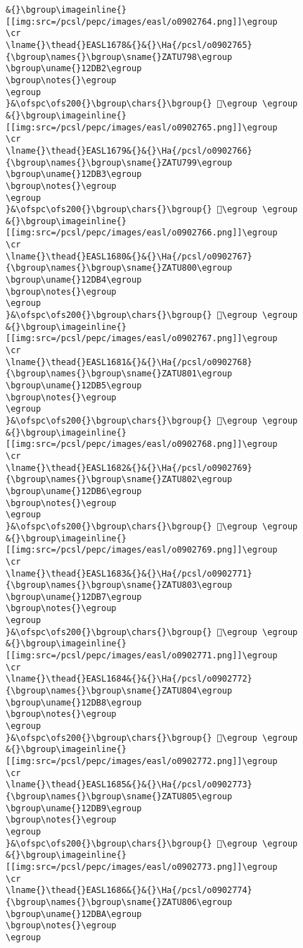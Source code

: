 \begin{verbatim}
&{}\bgroup\imageinline{}[[img:src=/pcsl/pepc/images/easl/o0902764.png]]\egroup
\cr
\lname{}\thead{}EASL1678&{}&{}\Ha{/pcsl/o0902765}{\bgroup\names{}\bgroup\sname{}ZATU798\egroup
\bgroup\uname{}12DB2\egroup
\bgroup\notes{}\egroup
\egroup
}&\ofspc\ofs200{}\bgroup\chars{}\bgroup{} 𒶲\egroup \egroup
&{}\bgroup\imageinline{}[[img:src=/pcsl/pepc/images/easl/o0902765.png]]\egroup
\cr
\lname{}\thead{}EASL1679&{}&{}\Ha{/pcsl/o0902766}{\bgroup\names{}\bgroup\sname{}ZATU799\egroup
\bgroup\uname{}12DB3\egroup
\bgroup\notes{}\egroup
\egroup
}&\ofspc\ofs200{}\bgroup\chars{}\bgroup{} 𒶳\egroup \egroup
&{}\bgroup\imageinline{}[[img:src=/pcsl/pepc/images/easl/o0902766.png]]\egroup
\cr
\lname{}\thead{}EASL1680&{}&{}\Ha{/pcsl/o0902767}{\bgroup\names{}\bgroup\sname{}ZATU800\egroup
\bgroup\uname{}12DB4\egroup
\bgroup\notes{}\egroup
\egroup
}&\ofspc\ofs200{}\bgroup\chars{}\bgroup{} 𒶴\egroup \egroup
&{}\bgroup\imageinline{}[[img:src=/pcsl/pepc/images/easl/o0902767.png]]\egroup
\cr
\lname{}\thead{}EASL1681&{}&{}\Ha{/pcsl/o0902768}{\bgroup\names{}\bgroup\sname{}ZATU801\egroup
\bgroup\uname{}12DB5\egroup
\bgroup\notes{}\egroup
\egroup
}&\ofspc\ofs200{}\bgroup\chars{}\bgroup{} 𒶵\egroup \egroup
&{}\bgroup\imageinline{}[[img:src=/pcsl/pepc/images/easl/o0902768.png]]\egroup
\cr
\lname{}\thead{}EASL1682&{}&{}\Ha{/pcsl/o0902769}{\bgroup\names{}\bgroup\sname{}ZATU802\egroup
\bgroup\uname{}12DB6\egroup
\bgroup\notes{}\egroup
\egroup
}&\ofspc\ofs200{}\bgroup\chars{}\bgroup{} 𒶶\egroup \egroup
&{}\bgroup\imageinline{}[[img:src=/pcsl/pepc/images/easl/o0902769.png]]\egroup
\cr
\lname{}\thead{}EASL1683&{}&{}\Ha{/pcsl/o0902771}{\bgroup\names{}\bgroup\sname{}ZATU803\egroup
\bgroup\uname{}12DB7\egroup
\bgroup\notes{}\egroup
\egroup
}&\ofspc\ofs200{}\bgroup\chars{}\bgroup{} 𒶷\egroup \egroup
&{}\bgroup\imageinline{}[[img:src=/pcsl/pepc/images/easl/o0902771.png]]\egroup
\cr
\lname{}\thead{}EASL1684&{}&{}\Ha{/pcsl/o0902772}{\bgroup\names{}\bgroup\sname{}ZATU804\egroup
\bgroup\uname{}12DB8\egroup
\bgroup\notes{}\egroup
\egroup
}&\ofspc\ofs200{}\bgroup\chars{}\bgroup{} 𒶸\egroup \egroup
&{}\bgroup\imageinline{}[[img:src=/pcsl/pepc/images/easl/o0902772.png]]\egroup
\cr
\lname{}\thead{}EASL1685&{}&{}\Ha{/pcsl/o0902773}{\bgroup\names{}\bgroup\sname{}ZATU805\egroup
\bgroup\uname{}12DB9\egroup
\bgroup\notes{}\egroup
\egroup
}&\ofspc\ofs200{}\bgroup\chars{}\bgroup{} 𒶹\egroup \egroup
&{}\bgroup\imageinline{}[[img:src=/pcsl/pepc/images/easl/o0902773.png]]\egroup
\cr
\lname{}\thead{}EASL1686&{}&{}\Ha{/pcsl/o0902774}{\bgroup\names{}\bgroup\sname{}ZATU806\egroup
\bgroup\uname{}12DBA\egroup
\bgroup\notes{}\egroup
\egroup

\end{verbatim}
